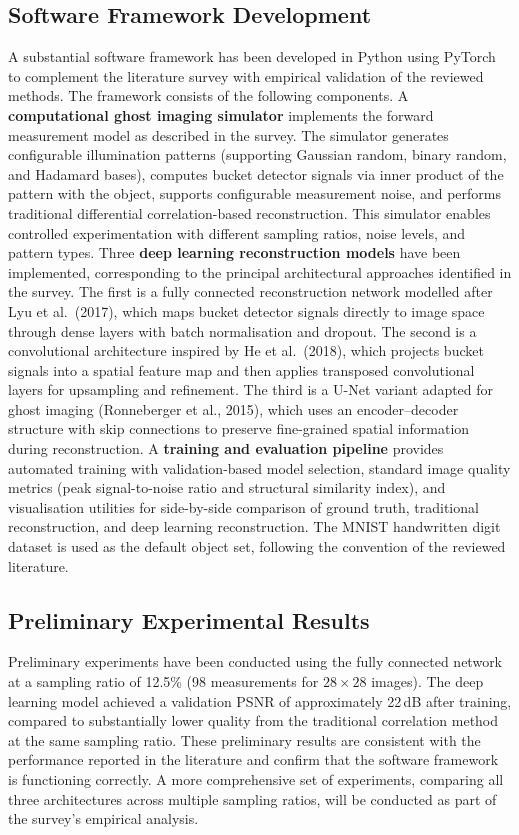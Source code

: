 \documentclass[12pt,a4paper]{article}
\begin{document}
\subsection{Software Framework Development}
A substantial software framework has been developed in Python using PyTorch to complement the literature survey with empirical validation of the reviewed methods. The framework consists of the following components.
A \textbf{computational ghost imaging simulator} implements the forward measurement model as described in the survey. The simulator generates configurable illumination patterns (supporting Gaussian random, binary random, and Hadamard bases), computes bucket detector signals via inner product of the pattern with the object, supports configurable measurement noise, and performs traditional differential correlation-based reconstruction. This simulator enables controlled experimentation with different sampling ratios, noise levels, and pattern types.
Three \textbf{deep learning reconstruction models} have been implemented, corresponding to the principal architectural approaches identified in the survey. The first is a fully connected reconstruction network modelled after Lyu et al.\ (2017), which maps bucket detector signals directly to image space through dense layers with batch normalisation and dropout. The second is a convolutional architecture inspired by He et al.\ (2018), which projects bucket signals into a spatial feature map and then applies transposed convolutional layers for upsampling and refinement. The third is a U-Net variant adapted for ghost imaging (Ronneberger et al., 2015), which uses an encoder--decoder structure with skip connections to preserve fine-grained spatial information during reconstruction.
A \textbf{training and evaluation pipeline} provides automated training with validation-based model selection, standard image quality metrics (peak signal-to-noise ratio and structural similarity index), and visualisation utilities for side-by-side comparison of ground truth, traditional reconstruction, and deep learning reconstruction. The MNIST handwritten digit dataset is used as the default object set, following the convention of the reviewed literature.
\subsection{Preliminary Experimental Results}
Preliminary experiments have been conducted using the fully connected network at a sampling ratio of 12.5\% (98 measurements for $28 \times 28$ images). The deep learning model achieved a validation PSNR of approximately 22\,dB after training, compared to substantially lower quality from the traditional correlation method at the same sampling ratio. These preliminary results are consistent with the performance reported in the literature and confirm that the software framework is functioning correctly. A more comprehensive set of experiments, comparing all three architectures across multiple sampling ratios, will be conducted as part of the survey's empirical analysis.
\end{document}
